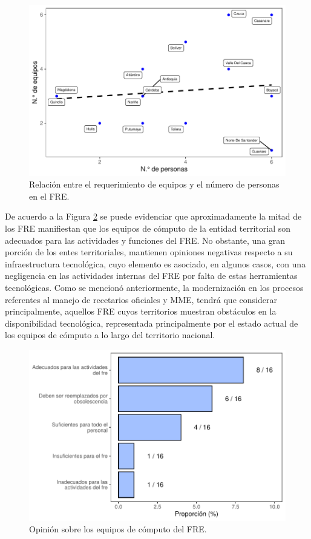 \documentclass[
]{book}
\begin{document}
\begin{figure}

{\centering \includegraphics[width=0.85\linewidth]{InformeFinal_files/figure-latex/RelacionEquiposPersonal-1} 

}

\caption{Relación entre el requerimiento de equipos y el número de personas en el FRE.}\label{fig:RelacionEquiposPersonal}
\end{figure}

De acuerdo a la Figura \ref{fig:OpinionEquiposComputo} se puede evidenciar que aproximadamente la mitad de los FRE manifiestan que los equipos de cómputo de la entidad territorial son adecuados para las actividades y funciones del FRE. No obstante, una gran porción de los entes territoriales, mantienen opiniones negativas respecto a su infraestructura tecnológica, cuyo elemento es asociado, en algunos casos, con una negligencia en las actividades internas del FRE por falta de estas herramientas tecnológicas. Como se mencionó anteriormente, la modernización en los procesos referentes al manejo de recetarios oficiales y MME, tendrá que considerar principalmente, aquellos FRE cuyos territorios muestran obstáculos en la disponibilidad tecnológica, representada principalmente por el estado actual de los equipos de cómputo a lo largo del territorio nacional.

\begin{figure}

{\centering \includegraphics[width=0.85\linewidth]{InformeFinal_files/figure-latex/OpinionEquiposComputo-1} 

}

\caption{Opinión sobre los equipos de cómputo del FRE.}\label{fig:OpinionEquiposComputo}
\end{figure}
\end{document}

